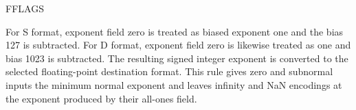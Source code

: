 \begin{manualflageffects}{FFLAGS}
\end{manualflageffects}

For S format, exponent field zero is treated as biased exponent one and the bias 127 is subtracted. For D format, exponent field zero is likewise treated as one and bias 1023 is subtracted. The resulting signed integer exponent is converted to the selected floating-point destination format. This rule gives zero and subnormal inputs the minimum normal exponent and leaves infinity and NaN encodings at the exponent produced by their all-ones field.
